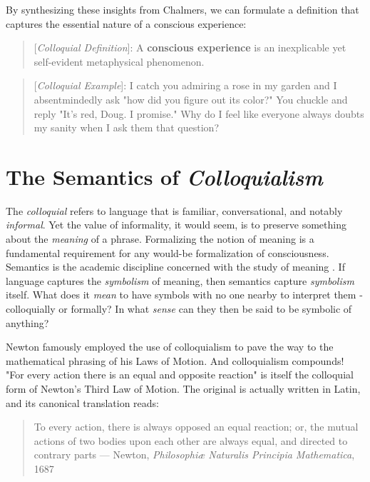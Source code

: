 \documentclass[runningheads]{llncs}
\begin{document}
By synthesizing these insights from Chalmers, we can formulate a definition that captures the essential nature of a conscious experience:

\begin{quote}
[\emph{Colloquial Definition}]: A \textbf{conscious experience} is an inexplicable yet self-evident metaphysical phenomenon.
\end{quote}

\begin{quote}
[\emph{Colloquial Example}]: I catch you admiring a rose in my garden and I absentmindedly ask "how did you figure out its color?" You chuckle and reply "It's red, Doug. I promise." Why do I feel like everyone always doubts my sanity when I ask them that question?
\end{quote}

\section{The Semantics of \emph{Colloquialism}}

The \emph{colloquial} refers to language that is familiar, conversational, and notably \emph{informal}. Yet the value of informality, it would seem, is to preserve something about the \emph{meaning} of a phrase. Formalizing the notion of meaning is a fundamental requirement for any would-be formalization of consciousness. Semantics is the academic discipline concerned with the study of meaning \cite{Grice1957}. If language captures the \emph{symbolism} of meaning, then semantics capture \emph{symbolism} itself. What does it \emph{mean} to have symbols with no one nearby to interpret them - colloquially or formally? In what \emph{sense} can they then be said to be symbolic of anything?

Newton famously employed the use of colloquialism to pave the way to the mathematical phrasing of his Laws of Motion. And colloquialism compounds! "For every action there is an equal and opposite reaction" is itself the colloquial form of Newton's Third Law of Motion. The original is actually written in Latin, and its canonical translation reads:

\begin{quote}
To every action, there is always opposed an equal reaction; or, the mutual actions of two bodies upon each other are always equal, and directed to contrary parts --- Newton, \emph{Philosophiæ Naturalis Principia Mathematica}, 1687
\end{quote}
\end{document}
